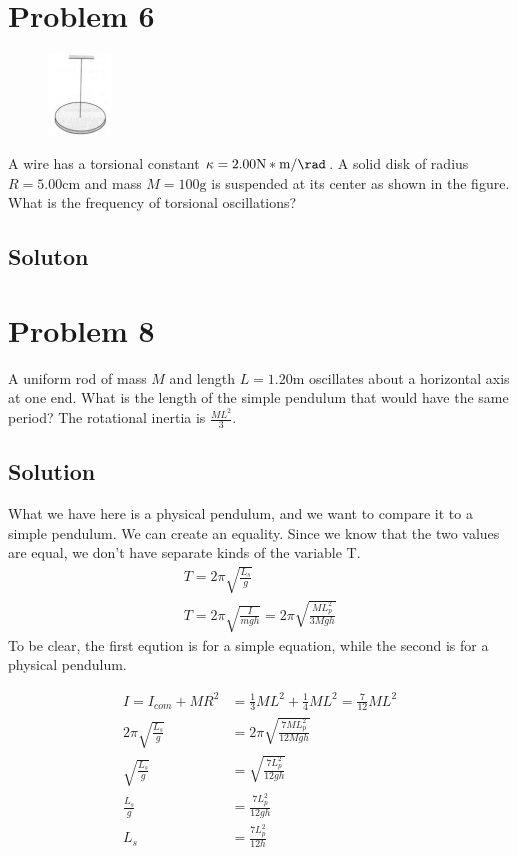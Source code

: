 \documentclass[12pt]{article}
\begin{document}
\pagebreak
\section{Problem 6}
\begin{figure}
    \vspace{-30pt}
    \includegraphics[width=0.15\textwidth]{graph_6.png} 
\end{figure}
A wire has a torsional constant $\kappa = 2.00 \unit{\newton*\meter/\rad}$. A solid disk of radius $R = 5.00 \unit{\centi\meter}$ and mass $M = 100 \unit{\gram}$ is suspended at its center as shown in the figure. What is the frequency of torsional oscillations?

\subsection{Soluton}



\pagebreak
\section{Problem 8}
A uniform rod of mass $M$ and length $L = 1.20 \unit{\meter}$ oscillates about a horizontal axis at one end. What is the length of the simple pendulum that would have the same period? The rotational inertia is $\frac{ML^2}{3}$.

\subsection{Solution}
What we have here is a physical pendulum, and we want to compare it to a simple pendulum. We can create an equality. Since we know that the two values are equal, we don't have separate kinds of the variable T. 
\begin{gather}
    T   =   2\pi\sqrt{\frac{L_s}{g}}\\
    T   =   2\pi\sqrt{\frac{I}{mgh}}
        =   2\pi\sqrt{\frac{ML_p^2}{3Mgh}}
\end{gather}
To be clear, the first eqution is for a simple equation, while the second is for a physical pendulum.

\begin{align}
    I   =   I_{com} + MR^2
        &=  \frac{1}{3}ML^2 + \frac{1}{4}ML^2
        =   \frac{7}{12}ML^2\\
    2\pi\sqrt{\frac{L_s}{g}}    &=  2\pi\sqrt{\frac{7ML_p^2}{12Mgh}}\\
    \sqrt{\frac{L_s}{g}}  &=  \sqrt{\frac{7L_p^2}{12gh}}\\
    \frac{L_s}{g}   &=  \frac{7L_p^2}{12gh}\\
    L_s &=  \frac{7L_p^2}{12h}
\end{align}
\end{document}
